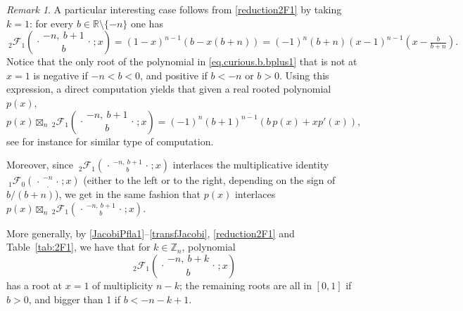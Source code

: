 \documentclass[reqno,11pt]{amsart}
\theoremstyle{remark}
\newtheorem{remark}[theorem]{Remark}
\newcommand{\rr}{\mathbb{R}}
\newcommand{\zz}{\mathbb{Z}}
\newcommand{\raising}[2]{\left(#1\right)^{\overline{#2}}}
\newcommand*\pFq[5]{%
 {\ }_{#1}{\mathcal F}_{#2}{\left(\genfrac..{0pt}{}{#3}{#4};#5\right)}%
}
\begin{document}
\begin{remark}
\label{rem.multiple.roots}
A particular interesting case follows from \eqref{reduction2F1} by taking $k=1$: for every $b\in \rr \setminus\{-n\}$ one has
\begin{equation}
\label{eq.curious.b.bplus1}
\pFq{2}{1}{-n,\ b+1}{ b}{x}= (1-x)^{n-1} \left(b-x(b+n)\right)=(-1)^n (b+n) (x-1)^{n-1}(x-\tfrac{b}{b+n}) .
\end{equation}
Notice that the only root of the polynomial in \eqref{eq.curious.b.bplus1} that is not at $x=1$ is negative if $-n<b<0$, and positive if $b<-n$ or $b>0$. Using this expression, a direct computation yields that given a real rooted polynomial $p(x)$, %
$$
p(x) \boxtimes_n \pFq{2}{1}{-n,\ b+1}{ b}{x} =  (-1)^n \raising{b+1}{n-1} \left(  b \, p(x) +  x p'(x) \right),$$
see for instance \cite[Lemma 3.5]{arizmendi2021finite} for similar type of computation.

Moreover, since $\pFq{2}{1}{-n,\ b+1}{ b}{x}$ interlaces the multiplicative identity $\pFq{1}{0}{-n}{.}{x}$ (either to the left or to the right, depending on the sign of $b/(b+n)$), we get in the same fashion that $p(x)$ interlaces $p(x) \boxtimes_n \pFq{2}{1}{-n,\ b+1}{ b}{x}$.

More generally, by \eqref{JacobiPfla1}--\eqref{transfJacobi}, \eqref{reduction2F1} and Table~\ref{tab:2F1}, we have that for $k\in \zz_n$, polynomial
\begin{equation}
\label{eq.curious.b.bplusk}
\pFq{2}{1}{-n,\ b+k}{ b}{x}
\end{equation}
has a root at $x=1$ of multiplicity $n-k$; the remaining roots are all in $[0,1]$ if $b>0$, and bigger than 1 if $b<-n-k+1$.
\end{remark}
\end{document}
